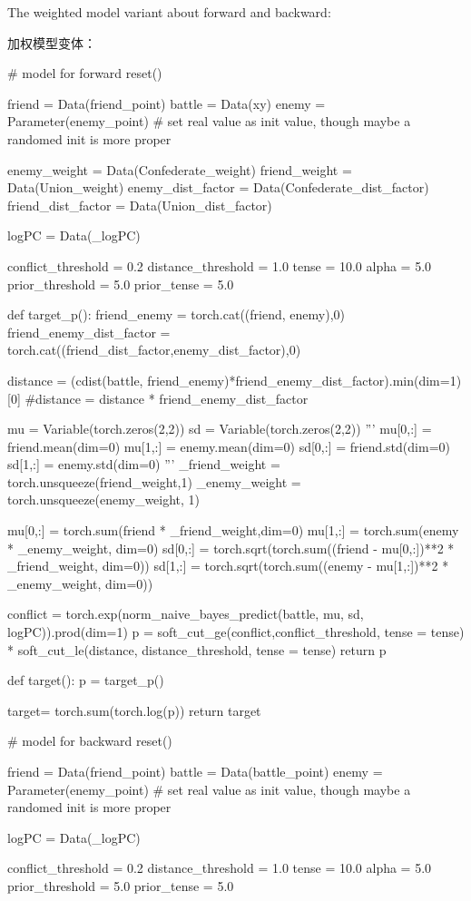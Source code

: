\documentclass{article}
\begin{document}
The weighted model variant about forward and backward:

加权模型变体：

\begin{python}
# model for forward
reset()

friend = Data(friend_point)
battle = Data(xy)
enemy = Parameter(enemy_point) # set real value as init value, though maybe a randomed init is more proper

enemy_weight = Data(Confederate_weight)
friend_weight = Data(Union_weight)
enemy_dist_factor = Data(Confederate_dist_factor)
friend_dist_factor = Data(Union_dist_factor)


logPC = Data(_logPC)

conflict_threshold = 0.2
distance_threshold = 1.0
tense = 10.0
alpha = 5.0
prior_threshold = 5.0
prior_tense = 5.0

def target_p():
    friend_enemy = torch.cat((friend, enemy),0)
    friend_enemy_dist_factor = torch.cat((friend_dist_factor,enemy_dist_factor),0)
    
    distance = (cdist(battle, friend_enemy)*friend_enemy_dist_factor).min(dim=1)[0]
    #distance = distance * friend_enemy_dist_factor

    mu = Variable(torch.zeros(2,2)) 
    sd = Variable(torch.zeros(2,2))
    '''
    mu[0,:] = friend.mean(dim=0)
    mu[1,:] = enemy.mean(dim=0)
    sd[0,:] = friend.std(dim=0)
    sd[1,:] = enemy.std(dim=0)
    '''
    _friend_weight = torch.unsqueeze(friend_weight,1)
    _enemy_weight  = torch.unsqueeze(enemy_weight, 1)
    
    mu[0,:] = torch.sum(friend * _friend_weight,dim=0)
    mu[1,:] = torch.sum(enemy  * _enemy_weight, dim=0)
    sd[0,:] = torch.sqrt(torch.sum((friend - mu[0,:])**2 * _friend_weight, dim=0))
    sd[1,:] = torch.sqrt(torch.sum((enemy  - mu[1,:])**2 * _enemy_weight, dim=0))
    
    conflict = torch.exp(norm_naive_bayes_predict(battle, mu, sd, logPC)).prod(dim=1)
    p = soft_cut_ge(conflict,conflict_threshold, tense = tense) * soft_cut_le(distance, distance_threshold, tense = tense)
    return p

def target():
    p = target_p()
    
    target= torch.sum(torch.log(p))
    return target
    
# model for backward
reset()

friend = Data(friend_point)
battle = Data(battle_point)
enemy = Parameter(enemy_point) # set real value as init value, though maybe a randomed init is more proper

logPC = Data(_logPC)

conflict_threshold = 0.2
distance_threshold = 1.0
tense = 10.0
alpha = 5.0
prior_threshold = 5.0
prior_tense = 5.0


\end{python}
\end{document}

